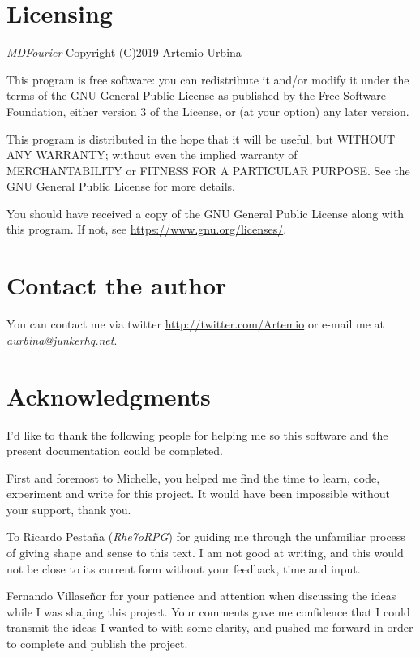 \documentclass[10pt,a4paper]{report}
\begin{document}
\begin{appendices}
\chapter{Licensing}
\label{license}

\textit{MDFourier} Copyright (C)2019 Artemio Urbina

This program is free software: you can redistribute it and/or modify
it under the terms of the GNU General Public License as published by
the Free Software Foundation, either version 3 of the License, or
(at your option) any later version.

This program is distributed in the hope that it will be useful,
but WITHOUT ANY WARRANTY; without even the implied warranty of
MERCHANTABILITY or FITNESS FOR A PARTICULAR PURPOSE.  See the
GNU General Public License for more details.

You should have received a copy of the GNU General Public License
along with this program.  If not, see \url{https://www.gnu.org/licenses/}.	

\chapter{Contact the author}
\label{contact}

You can contact me via twitter \url{http://twitter.com/Artemio} or e-mail me at \textit{aurbina@junkerhq.net}.

\chapter{Acknowledgments}

I'd like to thank the following people for helping me so this software and the present documentation could be completed. 

First and foremost to Michelle, you helped me find the time to learn, code, experiment and write for this project. It would have been impossible without your support, thank you.

To Ricardo Pestaña (\textit{Rhe7oRPG}) for guiding me through the unfamiliar process of giving shape and sense to this text. I am not good at writing, and this would not be close to its current form without your feedback, time and input.

Fernando Villaseñor for your patience and attention when discussing the ideas while I was shaping this project. Your comments gave me confidence that I could transmit the ideas I wanted to with some clarity, and pushed me forward in order to complete and publish the project.


\end{appendices}
\end{document}
